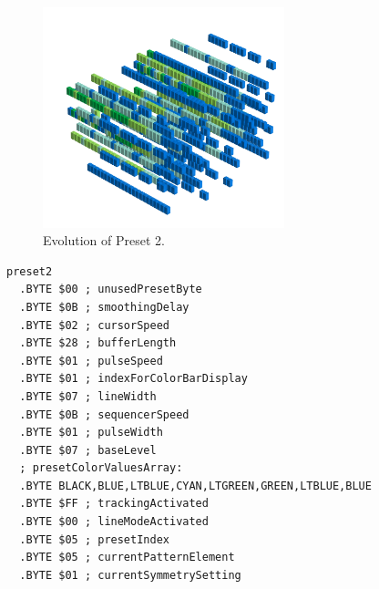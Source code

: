 \begin{minipage}[b]{0.48\linewidth}

\begin{figure}[H]                                                          
  \centering                                                             
  \begin{adjustbox}{width=7cm,center}                                   
  \includegraphics[width=7cm]{src/presets/pattern2-45.png}%
  \end{adjustbox}                                                        
\caption{Evolution of Preset 2.}                                           
\end{figure}                                                               
\end{minipage}
\hspace{0.1cm}
\begin{minipage}[b]{0.48\linewidth}                            
                                                                           
\begin{lstlisting}[basicstyle=\ttfamily\scriptsize,caption=Data structure for Preset 2.]
preset2
  .BYTE $00 ; unusedPresetByte
  .BYTE $0B ; smoothingDelay
  .BYTE $02 ; cursorSpeed
  .BYTE $28 ; bufferLength
  .BYTE $01 ; pulseSpeed
  .BYTE $01 ; indexForColorBarDisplay
  .BYTE $07 ; lineWidth
  .BYTE $0B ; sequencerSpeed
  .BYTE $01 ; pulseWidth
  .BYTE $07 ; baseLevel
  ; presetColorValuesArray: 
  .BYTE BLACK,BLUE,LTBLUE,CYAN,LTGREEN,GREEN,LTBLUE,BLUE
  .BYTE $FF ; trackingActivated
  .BYTE $00 ; lineModeActivated
  .BYTE $05 ; presetIndex
  .BYTE $05 ; currentPatternElement
  .BYTE $01 ; currentSymmetrySetting
\end{lstlisting}
\end{minipage}


